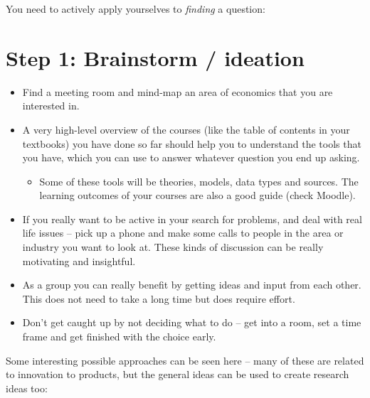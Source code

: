 \documentclass[
]{book}
\providecommand{\tightlist}{%
  \setlength{\itemsep}{0pt}\setlength{\parskip}{0pt}}
\begin{document}
You need to actively apply yourselves to \emph{finding} a question:

\hypertarget{step-1-brainstorm-ideation}{%
\section{Step 1: Brainstorm / ideation}\label{step-1-brainstorm-ideation}}

\begin{itemize}
\item
  Find a meeting room and mind-map an area of economics that you are
  interested in.
\item
  A very high-level overview of the courses (like the table of
  contents in your textbooks) you have done so far should help you to
  understand the tools that you have, which you can use to answer
  whatever question you end up asking.

  \begin{itemize}
  \tightlist
  \item
    Some of these tools will be theories, models, data types and
    sources. The learning outcomes of your courses are also a good
    guide (check Moodle).
  \end{itemize}
\item
  If you really want to be active in your search for problems, and
  deal with real life issues -- pick up a phone and make some calls to
  people in the area or industry you want to look at. These kinds of
  discussion can be really motivating and insightful.
\item
  As a group you can really benefit by getting ideas and input from
  each other. This does not need to take a long time but does require
  effort.
\item
  Don't get caught up by not deciding what to do -- get into a room,
  set a time frame and get finished with the choice early.
\end{itemize}

Some interesting possible approaches can be seen here -- many of these
are related to innovation to products, but the general ideas can be used
to create research ideas too:
\end{document}
